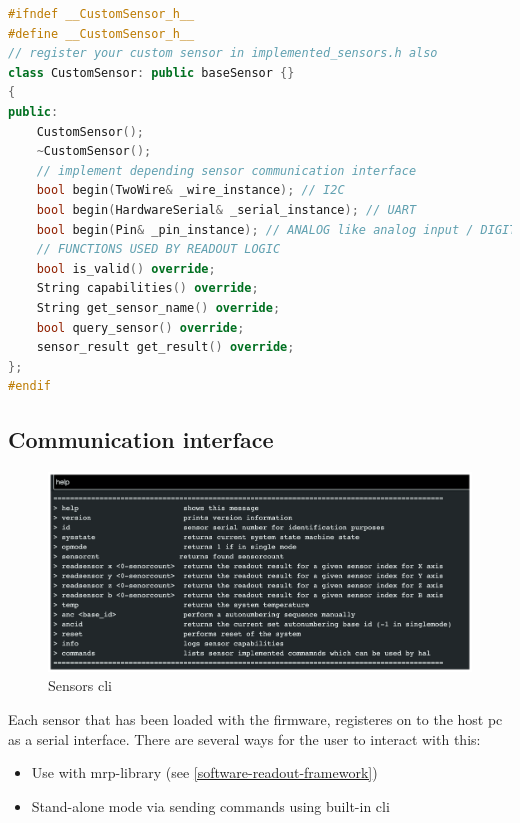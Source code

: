 \begin{lstlisting}[language={C++}, caption={CustomSensor-Class for adding new sensor hardware support}, label=lst:CustomSensorClass]
#ifndef __CustomSensor_h__
#define __CustomSensor_h__
// register your custom sensor in implemented_sensors.h also
class CustomSensor: public baseSensor {}
{
public:
    CustomSensor();
    ~CustomSensor();
    // implement depending sensor communication interface
    bool begin(TwoWire& _wire_instance); // I2C
    bool begin(HardwareSerial& _serial_instance); // UART
    bool begin(Pin& _pin_instance); // ANALOG like analog input / DIGITAL PIN like onewire
    // FUNCTIONS USED BY READOUT LOGIC
    bool is_valid() override;
    String capabilities() override;
    String get_sensor_name() override;
    bool query_sensor() override;
    sensor_result get_result() override;        
};
#endif
\end{lstlisting}

\hypertarget{communication-interface}{%
\subsection{Communication interface}\label{communication-interface}}

\begin{figure}
\centering
\includegraphics{./generated_images/border_Sensors_(+cli).png}
\caption{Sensors \gls{cli} \label{Sensors_(+cli).png}}
\end{figure}

Each sensor that has been loaded with the firmware, registeres on to the
host \gls{pc} as a serial interface. There are several ways for the user
to interact with this:

\begin{itemize}
\tightlist
\item
  Use with \gls{mrp}-library (see \ref{software-readout-framework})
\item
  Stand-alone mode via sending commands using built-in \gls{cli}
\end{itemize}

